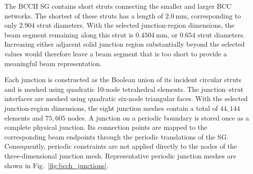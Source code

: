 The BCCH SG contains short struts connecting the smaller and larger BCC networks. The shortest of these struts has a length of $2.0~\text{mm}$, corresponding to only $2.904$ strut diameters. With the selected junction-region dimensions, the beam segment remaining along this strut is $0.4504~\text{mm}$, or $0.654$ strut diameters. Increasing either adjacent solid junction region substantially beyond the selected values would therefore leave a beam segment that is too short to provide a meaningful beam representation.

Each junction is constructed as the Boolean union of its incident circular struts and is meshed using quadratic 10-node tetrahedral elements. The junction--strut interfaces are meshed using quadratic six-node triangular faces. With the selected junction-region dimensions, the eight junction meshes contain a total of $44{,}144$ elements and $75{,}605$ nodes. A junction on a periodic boundary is stored once as a complete physical junction. Its connection points are mapped to the corresponding beam endpoints through the periodic translations of the SG. Consequently, periodic constraints are not applied directly to the nodes of the three-dimensional junction mesh. Representative periodic junction meshes are shown in Fig.~\ref{fig:bcch_junctions}.
